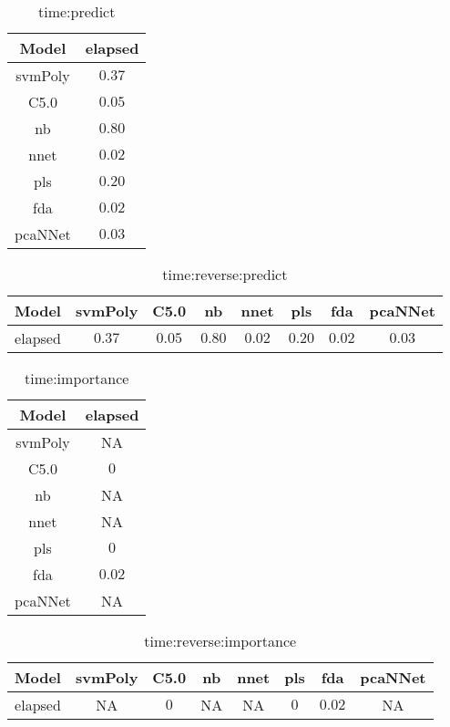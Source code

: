 \begin{table}[!ht]
	\centering
	\begin{tabular}{|c|c|}
		\hline
		Model & elapsed \\ \hline
		svmPoly & $0.37$ \\ \hline
		C5.0 & $0.05$ \\ \hline
		nb & $0.80$ \\ \hline
		nnet & $0.02$ \\ \hline
		pls & $0.20$ \\ \hline
		fda & $0.02$ \\ \hline
		pcaNNet & $0.03$ \\ \hline
	\end{tabular}
	\caption{time:predict}
	\label{tab:time:predict}
\end{table}

\begin{table}[!ht]
	\centering
	\begin{tabular}{|c|c|c|c|c|c|c|c|}
		\hline
		Model & svmPoly & C5.0 & nb & nnet & pls & fda & pcaNNet \\ \hline
		elapsed & $0.37$ & $0.05$ & $0.80$ & $0.02$ & $0.20$ & $0.02$ & $0.03$ \\ \hline
	\end{tabular}
	\caption{time:reverse:predict}
	\label{tab:time:reverse:predict}
\end{table}

\begin{table}[!ht]
	\centering
	\begin{tabular}{|c|c|}
		\hline
		Model & elapsed \\ \hline
		svmPoly & NA \\ \hline
		C5.0 & $0$ \\ \hline
		nb & NA \\ \hline
		nnet & NA \\ \hline
		pls & $0$ \\ \hline
		fda & $0.02$ \\ \hline
		pcaNNet & NA \\ \hline
	\end{tabular}
	\caption{time:importance}
	\label{tab:time:importance}
\end{table}

\begin{table}[!ht]
	\centering
	\begin{tabular}{|c|c|c|c|c|c|c|c|}
		\hline
		Model & svmPoly & C5.0 & nb & nnet & pls & fda & pcaNNet \\ \hline
		elapsed & NA & $0$ & NA & NA & $0$ & $0.02$ & NA \\ \hline
	\end{tabular}
	\caption{time:reverse:importance}
	\label{tab:time:reverse:importance}
\end{table}

